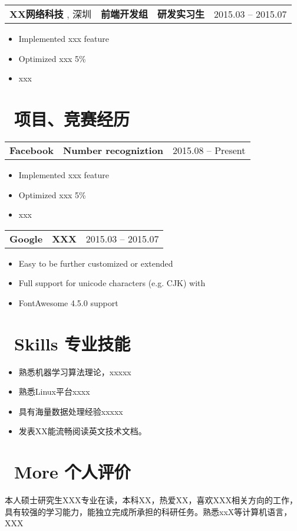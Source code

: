 \documentclass{resume}
\begin{document}
	\begin{tabularx}{\textwidth}{@{}X X X r@{}}
	\textbf{XX网络科技 }, 深圳 & \textbf{前端开发组} & \textbf{研发实习生} & 2015.03 -- 2015.07 \\
\end{tabularx}
\begin{itemize}
	  \item Implemented xxx feature
	\item Optimized xxx 5\%
	\item xxx
\end{itemize}
	
	
	\section{\faGraduationCap\ 项目、竞赛经历}
	\begin{tabularx}{\textwidth}{@{}X X r@{}}
		\textbf{Facebook} & \textbf{Number recogniztion} & 2015.08 -- Present \\
	\end{tabularx}
	\begin{itemize}
  	\item Implemented xxx feature
	\item Optimized xxx 5\%
	\item xxx
	\end{itemize}
	
	\begin{tabularx}{\textwidth}{@{}X X r@{}}
		\textbf{Google} & \textbf{XXX} & 2015.03 -- 2015.07 \\
	\end{tabularx}
	\begin{itemize}
		 \item Easy to be further customized or extended
		\item Full support for unicode characters (e.g. CJK) with \XeLaTeX\
		\item FontAwesome 4.5.0 support
	\end{itemize}
	
	\section{\faCogs\ Skills 专业技能}
	\begin{itemize}[parsep=0.5ex]
		\item 熟悉机器学习算法理论，xxxxx
		\item 熟悉Linux平台xxxx
		\item 具有海量数据处理经验xxxxx
		\item 发表XX能流畅阅读英文技术文档。
	\end{itemize}
	
	
	\section{\faInfo\ More 个人评价}
	本人硕士研究生XXX专业在读，本科XX，热爱XX，喜欢XXX相关方向的工作，具有较强的学习能力，能独立完成所承担的科研任务。熟悉xxX等计算机语言，XXX
	
\end{document}

